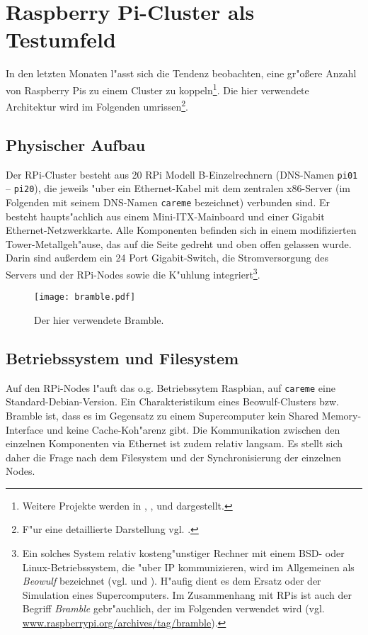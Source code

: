 \section{Raspberry Pi-Cluster als Testumfeld}\label{Bramble-Spezi}

In den letzten Monaten l"asst sich die Tendenz beobachten, eine gr"o\ss ere Anzahl von Raspberry Pis zu einem Cluster zu koppeln\footnote{Weitere Projekte werden in \cite{cox13}, \cite{kie01}, \cite{bal12} und \cite{ou13} dargestellt.}. Die hier verwendete Architektur wird im Folgenden umrissen\footnote{F"ur eine detaillierte Darstellung vgl. \cite{kli13}.}. 

\subsection{Physischer Aufbau}\label{Bramble-Hardware}

Der RPi-Cluster besteht aus 20 RPi Modell B-Einzelrechnern (DNS-Namen \texttt{pi01} -- \texttt{pi20}), die jeweils "uber ein Ethernet-Kabel mit dem zentralen x86-Server (im Folgenden mit seinem DNS-Namen \texttt{careme} bezeichnet) verbunden sind. Er besteht haupts"achlich aus einem Mini-ITX-Mainboard und einer Gigabit Ethernet-Netzwerkkarte. Alle Komponenten befinden sich in einem modifizierten Tower-Metallgeh"ause, das auf die Seite gedreht und oben offen gelassen wurde. Darin sind au\ss erdem ein 24 Port Gigabit-Switch, die Stromversorgung des Servers und der RPi-Nodes sowie die K"uhlung integriert\footnote{Ein solches System relativ kosteng"unstiger Rechner mit einem BSD- oder Linux-Betriebssystem, die "uber IP kommunizieren, wird im Allgemeinen als \textit{Beowulf} bezeichnet (vgl. \cite{kie01} und \cite{kli13}). H"aufig dient es dem Ersatz oder der Simulation eines Supercomputers. Im Zusammenhang mit RPis ist auch der Begriff \textit{Bramble} gebr"auchlich, der im Folgenden verwendet wird (vgl. \url{www.raspberrypi.org/archives/tag/bramble}).}. 
\begin{figure}[htb]
	\centering
	\texttt{[image: bramble.pdf]}\\ 
	\caption{Der hier verwendete Bramble.}\label{fig:Bramble}
\end{figure}
\newpage
\subsection{Betriebssystem und Filesystem}\label{Bramble-Architektur} 

Auf den RPi-Nodes l"auft das o.g. Betriebssytem Raspbian, auf \texttt{careme} eine Standard-Debian-Version. Ein Charakteristikum eines Beowulf-Clusters bzw. Bramble ist, dass es im Gegensatz zu einem Supercomputer kein Shared Memory-Interface und keine Cache-Koh"arenz gibt. Die Kommunikation zwischen den einzelnen Komponenten via Ethernet ist zudem relativ langsam. Es stellt sich daher die Frage nach dem Filesystem und der Synchronisierung der einzelnen Nodes. 

